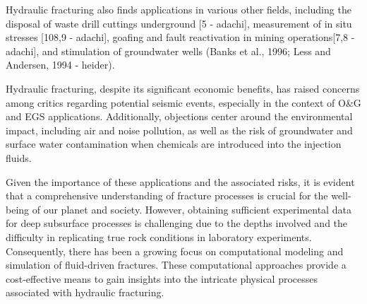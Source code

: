
Hydraulic fracturing also finds applications in various other fields, including the disposal of waste drill cuttings underground [5 - adachi], measurement of in situ stresses [108,9 - adachi], goafing and fault reactivation in mining operations[7,8 - adachi], and stimulation of groundwater wells (Banks et al., 1996; Less and Andersen, 1994 - heider).

Hydraulic fracturing, despite its significant economic benefits, has raised concerns among critics regarding potential seismic events, especially in the context of O\&G and EGS applications. Additionally, objections center around the environmental impact, including air and noise pollution, as well as the risk of groundwater and surface water contamination when chemicals are introduced into the injection fluids.

Given the importance of these applications and the associated risks, it is evident that a comprehensive understanding of fracture processes is crucial for the well-being of our planet and society. However, obtaining sufficient experimental data for deep subsurface processes is challenging due to the depths involved and the difficulty in replicating true rock conditions in laboratory experiments. Consequently, there has been a growing focus on computational modeling and simulation of fluid-driven fractures. These computational approaches provide a cost-effective means to gain insights into the intricate physical processes associated with hydraulic fracturing.

